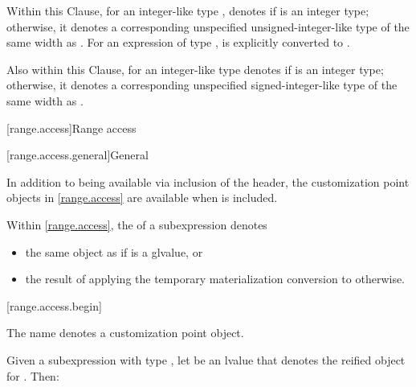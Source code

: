 \pnum
{}%
%
Within this Clause,
for an integer-like type ,
 denotes
 if  is an integer type;
otherwise, it denotes a corresponding unspecified unsigned-integer-like type
of the same width as .
For an expression  of type ,
 is
 explicitly converted to
.

\pnum
Also within this Clause,
 for an integer-like type 
denotes  if  is an integer type;
otherwise, it denotes a corresponding unspecified signed-integer-like type
of the same width as .

[range.access]{Range access}

[range.access.general]{General}

\pnum
In addition to being available via inclusion of the 
header, the customization point objects in \ref{range.access} are
available when  is included.

\pnum
Within \ref{range.access},
the  of a subexpression  denotes
\begin{itemize}
\item
the same object as  if  is a glvalue, or
\item
the result of applying
the temporary materialization conversion to  otherwise.
\end{itemize}

[range.access.begin]{}
%

\pnum
The name  denotes a customization point
object.

\pnum
Given a subexpression  with type ,
let  be an lvalue that denotes the reified object for .
Then:

